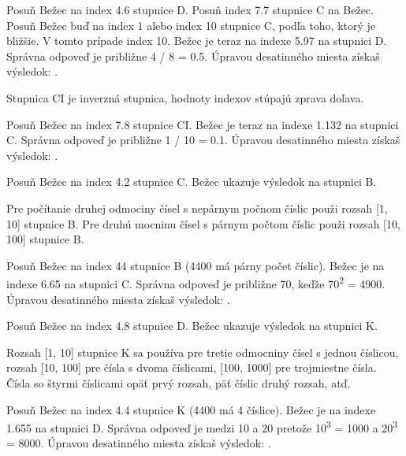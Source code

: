 \begin{multicols*}{3}
{  

Posuň Bežec na index 4.6 stupnice D.
Posuň index 7.7 stupnice C na Bežec.
Posuň Bežec buď na index 1 alebo index 10 stupnice C, podľa toho, ktorý je bližšie. V tomto prípade index 10.
Bežec je teraz na indexe 5.97 na stupnici D. Správna odpoveď je približne 4 / 8 = 0.5. Úpravou desatinného miesta získaš výsledok: .


\footnotesize Stupnica CI je inverzná stupnica, hodnoty indexov stúpajú zprava doľava. \normalsize

Posuň Bežec na index 7.8 stupnice CI.
Bežec je teraz na indexe 1.132 na stupnici C.
Správna odpoveď je približne 1 / 10 = 0.1. Úpravou desatinného miesta získaš výsledok: .


Posuň Bežec na index 4.2 stupnice C.
Bežec ukazuje výsledok  na stupnici B.


\footnotesize Pre počítanie druhej odmociny čísel s nepárnym počnom číslic použi rozsah [1, 10] stupnice B. Pre druhú mocninu čísel s párnym počtom číslic použi rozsah [10, 100] stupnice B. \normalsize

Posuň Bežec na index 44 stupnice B (4400 má párny počet číslic).
Bežec je na indexe 6.65 na stupnici C. Správna odpoveď je približne 70, keďže 70\textsuperscript{2} = 4900. Úpravou desatinného miesta získaš výsledok: .
\vfill\columnbreak
  \vspace*{-7mm}

Posuň Bežec na index 4.8 stupnice D.
Bežec ukazuje výsledok  na stupnici K.


\footnotesize Rozsah [1, 10] stupnice K sa používa pre tretie odmocniny čísel s jednou číslicou, rozsah [10, 100] pre čísla s dvoma číslicami, [100, 1000] pre trojmiestne čísla. Čísla so štyrmi číslicami opäť prvý rozsah, päť číslic druhý rozsah, atď. \normalsize

Posuň Bežec na index 4.4 stupnice K (4400 má 4 číslice).
Bežec je na indexe 1.655 na stupnici D.
Správna odpoveď je medzi 10 a 20 pretože 10\textsuperscript{3} = 1000 a 20\textsuperscript{3} = 8000. Úpravou desatinného miesta získaš výsledok: .

}
\end{multicols*}
